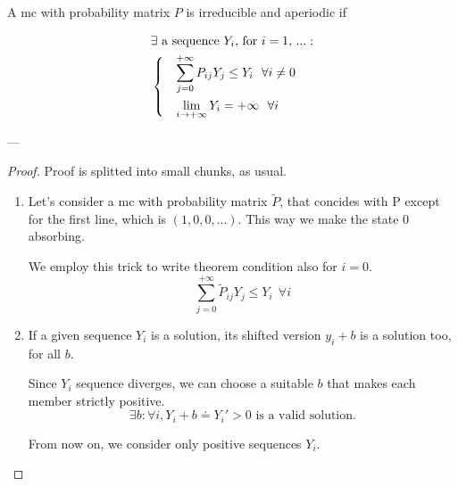 	\begin{theorem}[4.2, KT p. 95]
		A \gls{mc} with probability matrix $P$ is irreducible and aperiodic if

		\begin{equation}\begin{split}
			& \exists \text{ a sequence } Y_i \text{, for } i = 1,\,... :\\
			& \begin{dcases}
 				& \sum_{j=0}^{+\infty} P_{ij} Y_j \le Y_i 	~~ \forall i \neq 0 \\
 				& \lim_{i \to +\infty} Y_i = +\infty		~~ \forall i
			\end{dcases}
		\end{split}\end{equation}
	\end{theorem}
	---
	\begin{proof}
		Proof is splitted into small chunks, as usual.

		\begin{enumerate}
		\item Let's consider a \gls{mc} with probability matrix $\tilde{P}$, that concides with P except for the first line, which is $(1, 0, 0, ...)$.
		This way we make the state 0 absorbing.

		We employ this trick to write theorem condition also for $i=0$.
		$$ \sum_{j=0}^{+\infty} \tilde{P}_{ij} Y_j \le Y_i ~~ \forall i$$

		\item If a given sequence $Y_i$ is a solution, its shifted version $y_i + b$ is a solution too, for all $b$.

		Since $Y_i$ sequence diverges, we can choose a suitable $b$ that makes each member strictly positive.
		\begin{equation}
			\exists b: \forall i, Y_i + b \doteq Y_i' > 0 \text{ is a valid solution.}
		\end{equation}

		From now on, we consider only positive sequences $Y_i$.


\end{enumerate}
\end{proof}
